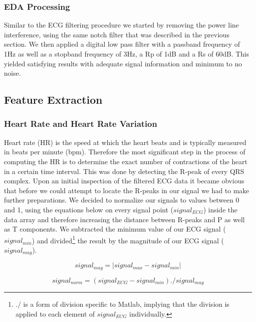 \subsubsection{EDA Processing}
Similar to the ECG filtering procedure we started by removing the power line interference, using the same notch filter that was described in the previous section. We then applied a digital low pass filter with a passband frequency of 1Hz as well as a stopband frequency of 3Hz, a Rp of 1dB and a Rs of 60dB. This yielded satisfying results with adequate signal information and minimum to no noise. 

\subsection{Feature Extraction}
\subsubsection{Heart Rate and Heart Rate Variation}\label{HRHRV}
Heart rate (HR) is the speed at which the heart beats and is typically measured in beats per minute (bpm). Therefore the most significant step in the process of computing the HR is to determine the exact number of contractions of the heart in a certain time interval. This was done by detecting the R-peak of every QRS complex. Upon an initial inspection of the filtered ECG data it became obvious that before we could attempt to locate the R-peaks in our signal we had to make further preparations. 
We decided to normalize our signals to values between 0 and 1, using the equations below on every signal point ($signal_{ECG}$) inside the data array and therefore increasing the distance between R-peaks and P as well as T components. We subtracted the minimum value of our ECG signal ($signal_{min}$) and divided\footnote{$./$ is a form of division specific to Matlab, implying that the division is applied to each element of $signal_{ECG}$ individually.} the result by the magnitude of our ECG signal ($signal_{mag}$). 

\begin{equation}
signal_{mag} = |signal_{max} - signal_{min}|
\end{equation}

\begin{equation}
signal_{norm} = (signal_{ECG} - signal_{min})./signal_{mag}
\end{equation}

